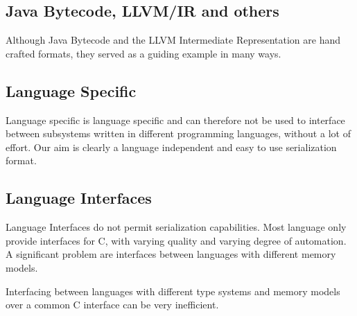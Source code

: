 \subsection*{Java Bytecode, LLVM/IR and others}

Although Java Bytecode and the LLVM Intermediate Representation are hand crafted formats, they served as a guiding example in many ways.


\subsection*{Language Specific}

Language specific is language specific and can therefore not be used to interface between subsystems written in different programming languages, without a lot of effort. Our aim is clearly a language independent and easy to use serialization format.


\subsection*{Language Interfaces}
Language Interfaces do not permit serialization capabilities. Most language only provide interfaces for C, with varying quality and varying degree of automation. A significant problem are interfaces between languages with different memory models.

Interfacing between languages with different type systems and memory models over a common C interface can be very inefficient.
